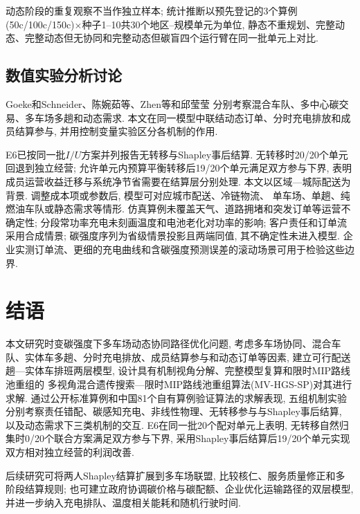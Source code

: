 \documentclass{setp-new}
\begin{document}
动态阶段的重复观察不当作独立样本;
统计推断以预先登记的3个算例(50c/100c/150c)$\times$种子1--10共30个地区--规模单元为单位,
静态不重规划、完整动态、完整动态但无协同和完整动态但碳盲四个运行臂在同一批单元上对比.

\subsection{数值实验分析讨论}

Goeke和Schneider\cite{ref:27}、陈婉茹等\cite{ref:23}、Zhen等\cite{ref:44}和邱莹莹\cite{ref:71}
分别考察混合车队、多中心碳交易、多车场多趟和动态需求.
本文在同一模型中联结动态订单、分时充电排放和成员结算参与,
并用控制变量实验区分各机制的作用.

E6已按同一批$I/U$方案并列报告无转移与Shapley事后结算.
无转移时20/20个单元回退到独立经营;
允许单元内预算平衡转移后19/20个单元满足双方参与下界,
表明成员运营收益迁移与系统净节省需要在结算层分别处理.
本文以区域—城际配送为背景. 调整成本项或参数后, 模型可对应城市配送、冷链物流、
单车场、单趟、纯燃油车队或静态需求等情形.
仿真算例未覆盖天气、道路拥堵和突发订单等运营不确定性;
分段常功率充电未刻画温度和电池老化对功率的影响;
客户责任和订单流采用合成情景; 碳强度序列为省级情景投影且两端同值, 其不确定性未进入模型.
企业实测订单流、更细的充电曲线和含碳强度预测误差的滚动场景可用于检验这些边界.

\section{结语}

本文研究时变碳强度下多车场动态协同路径优化问题,
考虑多车场协同、混合车队、实体车多趟、分时充电排放、成员结算参与和动态订单等因素,
建立可行配送趟—实体车排班两层模型,
设计具有机制视角分解、完整模型复算和限时MIP路线池重组的
多视角混合遗传搜索—限时MIP路线池重组算法(MV-HGS-SP)对其进行求解.
通过公开标准算例和中国81个自有算例验证算法的求解表现,
五组机制实验分别考察责任错配、碳感知充电、非线性物理、无转移参与与Shapley事后结算,
以及动态需求下三类机制的交互.
E6在同一批20个配对单元上表明, 无转移自然归集时0/20个联合方案满足双方参与下界,
采用Shapley事后结算后19/20个单元实现双方相对独立经营的利润改善.

后续研究可将两人Shapley结算扩展到多车场联盟, 比较核仁、服务质量修正和多阶段结算规则;
也可建立政府协调碳价格与碳配额、企业优化运输路径的双层模型,
并进一步纳入充电排队、温度相关能耗和随机行驶时间.
\end{document}
